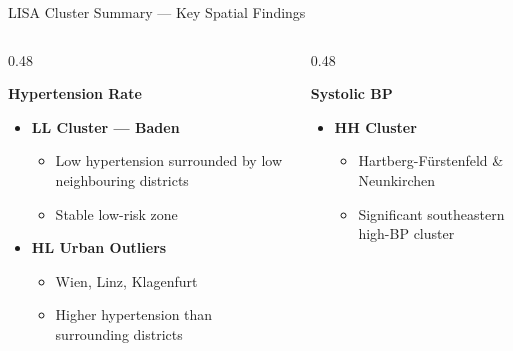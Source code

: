 \begin{frame}{LISA Cluster Summary --- Key Spatial Findings}

\scriptsize

\begin{columns}[T]

\begin{column}{0.48\textwidth}

\textbf{Hypertension Rate}

\vspace{0.05cm}

\begin{itemize}
\setlength{\itemsep}{0.15em}

\item \textbf{LL Cluster --- Baden}
\begin{itemize}
    \setlength{\itemsep}{0.05em}
    \item Low hypertension surrounded by low neighbouring districts
    \item Stable low-risk zone
\end{itemize}

\item \textbf{HL Urban Outliers}
\begin{itemize}
    \setlength{\itemsep}{0.05em}
    \item Wien, Linz, Klagenfurt
    \item Higher hypertension than surrounding districts
\end{itemize}

\end{itemize}

\end{column}

\begin{column}{0.48\textwidth}

\textbf{Systolic BP}

\vspace{0.05cm}

\begin{itemize}
\setlength{\itemsep}{0.15em}

\item \textbf{HH Cluster}
\begin{itemize}
    \setlength{\itemsep}{0.05em}
    \item Hartberg-Fürstenfeld \& Neunkirchen
    \item Significant southeastern high-BP cluster
\end{itemize}


\end{itemize}
\end{column}
\end{columns}
\end{frame}
